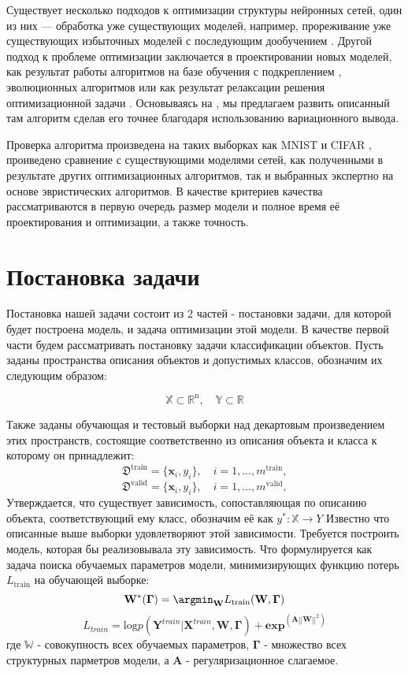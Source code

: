 \documentclass[12pt, twoside]{article}
\begin{document}
Существует несколько подходов к оптимизации структуры нейронных сетей, один из них --- обработка уже существующих моделей, например, прореживание уже существующих избыточных моделей с последующим дообучением \cite{learn_both, chan_prun, lottery_ticket}. Другой подход к проблеме оптимизации заключается в проектировании новых моделей, как результат работы алгоритмов на базе обучения с подкреплением \cite{nas}, эволюционных алгоритмов \cite{evol} или как результат релаксации решения оптимизационной задачи \cite{darts}. Основываясь на \cite{darts}, мы предлагаем развить описанный там алгоритм сделав его точнее благодаря использованию вариационного вывода.

Проверка алгоритма произведена на таких выборках как MNIST \cite{mnist} и CIFAR \cite{cifar}, проиведено сравнение с существующими моделями сетей, как полученными в результате других оптимизационных алгоритмов, так и выбранных экспертно на основе эвристических алгоритмов. В качестве критериев качества рассматриваются в первую очередь размер модели и полное время её проектирования и оптимизации, а также точность.

\section{Постановка задачи}

Постановка нашей задачи состоит из 2 частей - постановки задачи, для которой будет построена модель, и задача оптимизации этой модели. В качестве первой части будем рассматривать постановку задачи классификации объектов. Пусть заданы пространства описания объектов и допустимых классов, обозначим их следующим образом:

\[
\mathbb{X}\subset\mathbb{R}^\text{n}, \quad
\mathbb{Y}\subset\mathbb{R} 
\]

Также заданы обучающая и тестовый выборки над декартовым произведением этих пространств, состоящие соответственно из описания объекта и класса к которому он принадлежит:
\[
\mathfrak{D}^{\text{train}} = \{\mathbf{x}_i, y_i\}, \quad i=1,\dots,m^{\text{train}},
\]
\[
\mathfrak{D}^{\text{valid}} = \{\mathbf{x}_i, y_i\}, \quad i=1,\dots,m^{\text{valid}},
\]
Утверждается, что существует зависимость, сопоставляющая по описанию объекта, соответствующий ему класс, обозначим её как $y^*:\mathbb{X}\xrightarrow{}Y$ Известно что описанные выше выборки удовлетворяют этой зависимости. Требуется построить модель, которая бы реализовывала эту зависимость. Что формулируется как задача поиска обучаемых параметров модели, минимизирующих функцию потерь$L_\text{train}$ на обучающей выборке:
\[
\mathbf{W}^*( \boldsymbol{\Gamma}) = \argmin_{\mathbf{W}}
L_\text{train} (\mathbf{W}, \boldsymbol{\Gamma}) 
\]
\[
L_{train} = \text{log} p(\mathbf{Y}^{train}|\mathbf{X}^{train}, \mathbf{W}, \boldsymbol{\Gamma}) + \boldsymbol{exp}^{(\mathbf{A}||\mathbf{W}||^2)}
\]
где $\mathbb{W}$ - совокупность всех обучаемых параметров, $\boldsymbol{\Gamma}$ - множество всех структурных парметров модели, а $\mathbf{A}$ - регуляризационное слагаемое.
\end{document}
